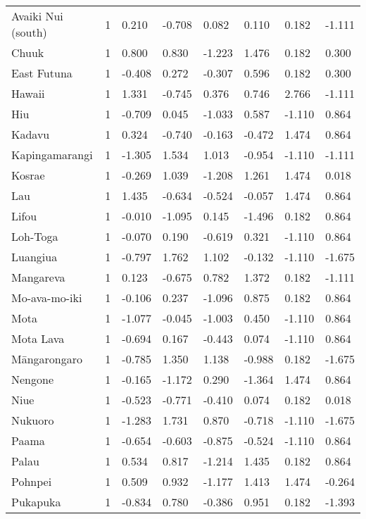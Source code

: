 \begin{longtable}{p{4.5cm}p{1.4cm}p{1.4cm}p{1.4cm}p{1.7cm}p{1.7cm}p{1.7cm}p{1.7cm}}
  Avaiki Nui (south) & 1 & 0.210 & -0.708 & 0.082 & 0.110 & 0.182 & -1.111 \\ 
  Chuuk & 1 & 0.800 & 0.830 & -1.223 & 1.476 & 0.182 & 0.300 \\ 
  East Futuna & 1 & -0.408 & 0.272 & -0.307 & 0.596 & 0.182 & 0.300 \\ 
  Hawaii & 1 & 1.331 & -0.745 & 0.376 & 0.746 & 2.766 & -1.111 \\ 
  Hiu & 1 & -0.709 & 0.045 & -1.033 & 0.587 & -1.110 & 0.864 \\ 
  Kadavu & 1 & 0.324 & -0.740 & -0.163 & -0.472 & 1.474 & 0.864 \\ 
  Kapingamarangi & 1 & -1.305 & 1.534 & 1.013 & -0.954 & -1.110 & -1.111 \\ 
  Kosrae & 1 & -0.269 & 1.039 & -1.208 & 1.261 & 1.474 & 0.018 \\ 
  Lau & 1 & 1.435 & -0.634 & -0.524 & -0.057 & 1.474 & 0.864 \\ 
  Lifou & 1 & -0.010 & -1.095 & 0.145 & -1.496 & 0.182 & 0.864 \\ 
  Loh-Toga & 1 & -0.070 & 0.190 & -0.619 & 0.321 & -1.110 & 0.864 \\ 
  Luangiua & 1 & -0.797 & 1.762 & 1.102 & -0.132 & -1.110 & -1.675 \\ 
  Mangareva & 1 & 0.123 & -0.675 & 0.782 & 1.372 & 0.182 & -1.111 \\ 
  Mo-ava-mo-iki & 1 & -0.106 & 0.237 & -1.096 & 0.875 & 0.182 & 0.864 \\ 
  Mota & 1 & -1.077 & -0.045 & -1.003 & 0.450 & -1.110 & 0.864 \\ 
  Mota Lava & 1 & -0.694 & 0.167 & -0.443 & 0.074 & -1.110 & 0.864 \\ 
  Māngarongaro & 1 & -0.785 & 1.350 & 1.138 & -0.988 & 0.182 & -1.675 \\ 
  Nengone & 1 & -0.165 & -1.172 & 0.290 & -1.364 & 1.474 & 0.864 \\ 
  Niue & 1 & -0.523 & -0.771 & -0.410 & 0.074 & 0.182 & 0.018 \\ 
  Nukuoro & 1 & -1.283 & 1.731 & 0.870 & -0.718 & -1.110 & -1.675 \\ 
  Paama & 1 & -0.654 & -0.603 & -0.875 & -0.524 & -1.110 & 0.864 \\ 
  Palau & 1 & 0.534 & 0.817 & -1.214 & 1.435 & 0.182 & 0.864 \\ 
  Pohnpei & 1 & 0.509 & 0.932 & -1.177 & 1.413 & 1.474 & -0.264 \\ 
  Pukapuka & 1 & -0.834 & 0.780 & -0.386 & 0.951 & 0.182 & -1.393 \\ 

\end{longtable}
